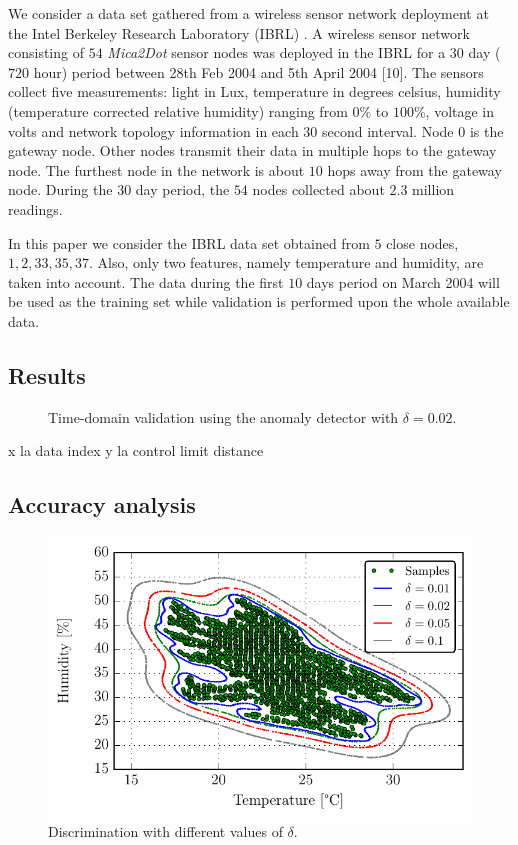\documentclass[3p]{elsarticle}
\theoremstyle{problemstyle}
\begin{document}
We consider a data set gathered from a wireless sensor network deployment at the Intel Berkeley Research Laboratory (IBRL) \cite{Buonadonna2005}. A wireless sensor network consisting of $54$ \emph{Mica2Dot} sensor nodes was deployed in the IBRL for a $30$ day ($720$ hour) period between 28th Feb 2004 and 5th April 2004 [10]. The sensors collect five measurements: light in Lux, temperature in degrees celsius, humidity (temperature corrected relative humidity) ranging from $0\%$ to $100\%$, voltage in volts and network topology information in each $30$ second interval. Node $0$ is the gateway node. Other nodes transmit their data in multiple hops to the gateway node. The furthest node in the network is about $10$ hops away from the gateway node. During the $30$ day period, the $54$ nodes collected about $2.3$ million readings.

In this paper we consider the IBRL data set obtained from $5$ close nodes, $1, 2, 33, 35, 37$. Also, only two features, namely temperature and humidity, are taken into account. The data during the first $10$ days period on March 2004 will be used as the training set while validation is performed upon the whole available data.

\subsection{Results}

\begin{figure}[H]
\centering
\caption{Time-domain validation using the anomaly detector with $\delta=0.02$.}
\end{figure}

x la data index
y la control limit distance

\subsection{Accuracy analysis}

\begin{figure}[H]
\centering
\includegraphics[scale=.6]{Figs/data_description.pdf}
\caption{Discrimination with different values of $\delta$.}
\end{figure}
\end{document}
